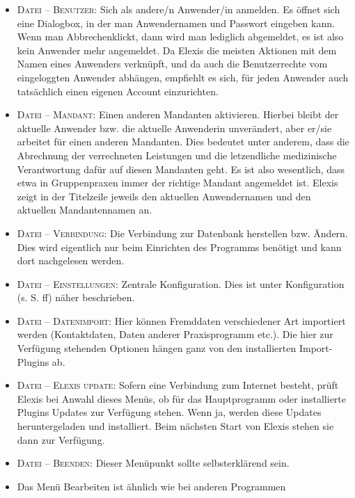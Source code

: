 \begin{itemize}
  \item {\textsc{Datei -- Benutzer}: Sich als andere/n Anwender/in anmelden. Es
  öffnet sich eine Dialogbox, in der man Anwendernamen und Passwort eingeben
  kann. Wenn man \glqq Abbrechen\grqq{}klickt, dann wird man lediglich
  abgemeldet, es ist also kein Anwender mehr angemeldet. Da Elexis die meisten
  Aktionen mit dem Namen eines Anwenders verknüpft, und da auch die
  Benutzerrechte vom eingeloggten Anwender abhängen, empfiehlt es sich, für
  jeden Anwender auch tatsächlich einen eigenen Account einzurichten. }
  \item {\textsc{Datei -- Mandant}: Einen anderen Mandanten aktivieren. Hierbei
  bleibt der aktuelle Anwender bzw. die aktuelle Anwenderin unverändert, aber
  er/sie arbeitet für einen anderen Mandanten. Dies bedeutet unter anderem, dass
  die Abrechnung der verrechneten Leistungen und die letzendliche medizinische
  Verantwortung dafür auf diesen Mandanten geht. Es ist also wesentlich, dass
  etwa in Gruppenpraxen immer der richtige Mandant angemeldet ist. Elexis zeigt
  in der Titelzeile jeweils den aktuellen Anwendernamen und den aktuellen
  Mandantennamen an.}
  \item {\textsc{Datei -- Verbindung}: Die Verbindung zur Datenbank herstellen
  bzw. Ändern. Dies wird eigentlich nur beim Einrichten des Programms benötigt
  und kann dort nachgelesen werden.}
  \item {\textsc{Datei -- Einstellungen}: Zentrale Konfiguration. Dies ist
  unter Konfiguration (s. S. \pageref{settings} ff) näher beschrieben.}
  \item {\textsc{Datei -- Datenimport}: Hier können Fremd\-daten verschie\-de\-ner
  Art impor\-tiert werden (Kontakt\-daten, Da\-ten anderer Praxis\-programm etc.). Die
  hier zur Ver\-fü\-gung ste\-hen\-den Op\-tio\-nen hängen ganz von den instal\-lier\-ten
  Import-Plugins ab.}
  \item {\textsc{Datei -- Elexis update}: Sofern eine Verbindung zum Internet
  besteht, prüft Elexis bei Anwahl dieses Menüs, ob für das Hauptprogramm oder
  installierte Plugins Updates zur Verfügung stehen. Wenn ja, werden diese
  Updates heruntergeladen und installiert. Beim nächsten Start von Elexis stehen
  sie dann zur Verfügung.}
  \item {\textsc{Datei -- Beenden}: Dieser Menüpunkt sollte selbsterklärend
  sein.}
  \item {Das Menü \glqq Bearbeiten\grqq{} ist ähnlich wie bei anderen Programmen
}
\end{itemize}
